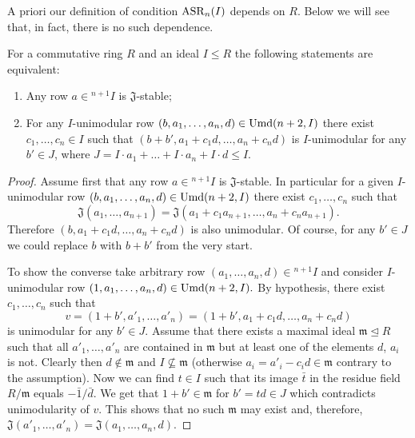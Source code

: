 A priori our definition of condition $\operatorname{ASR}_n(I)$ depends on $R$.
Below we will see that, in fact, there is no such dependence.
\begin{lemma}\label{lemma:relative-asr-unimod}
For a commutative ring $R$ and an ideal $I \leq R$ the following statements are equivalent:
\begin{enumerate} \item\label{asr-j-stable} Any row $a\in{}^{n+1}\!I$ is $\mathfrak{J}$-stable;
\item\label{asr-bak-like} For any $I$-unimodular row $(b,a_1,\ldots,a_n,d)\in\operatorname{Umd}(n+2,I)$ there exist $c_1,\ldots,c_n\in I$ 
 such that $(b+b',a_1+c_1d,\ldots,a_n+c_nd)$ is $I$-unimodular for any $b'\in J$, where $J=I \cdot a_1 + \ldots + I \cdot a_n + I \cdot d\leq I$.
\end{enumerate} 
\end{lemma}
\begin{proof}
Assume first that any row $a\in{}^{n+1}\!I$ is $\mathfrak{J}$-stable. 
In particular for a given $I$-unimodular row $(b,a_1,\ldots,a_n,d)\in\operatorname{Umd}(n+2,I)$ there exist $c_1,\ldots,c_n$ such that
\[\mathfrak{J}(a_1,\ldots,a_{n+1})=\mathfrak{J}(a_1+c_1a_{n+1},\ldots,a_n+c_na_{n+1}).\]
Therefore $(b,a_1+c_1d,\ldots,a_n+c_nd)$ is also unimodular. Of course, for any $b'\in J$ we could replace $b$ with $b+b'$ from the very start.

To show the converse take arbitrary row $(a_1,\ldots,a_n,d)\in{}^{n+1}\!I$ and consider $I$-unimodular row $(1,a_1,\ldots,a_n,d)\in\operatorname{Umd}(n+2,I).$
By hypothesis, there exist $c_1,\ldots,c_n$ such that \[ v=(1+b',a'_1,\ldots,a'_n)=(1+b',a_1+c_1d,\ldots,a_n+c_nd) \] is unimodular for any $b'\in J$.
Assume that there exists a maximal ideal $\mathfrak{m}\trianglelefteq R$ such that all $a'_1,\ldots,a'_n$ are contained in $\mathfrak{m}$
 but at least one of the elements $d$, $a_i$ is not.
Clearly then $d\notin\mathfrak{m}$ and $I\not\subseteq \mathfrak{m}$ (otherwise $a_i=a'_i-c_id\in\mathfrak{m}$ contrary to the assumption).
Now we can find $t\in I$ such that its image $\bar{t}$ in the residue field $R/\mathfrak{m}$ equals $-\bar{1}/\bar{d}$.
We get that $1 + b' \in \mathfrak{m}$ for $b'=td\in J$ which contradicts unimodularity of $v$.
This shows that no such $\mathfrak{m}$ may exist and, therefore, $\mathfrak{J}(a'_1,\ldots,a'_n)=\mathfrak{J}(a_1,\ldots,a_n,d)$.
\end{proof}

